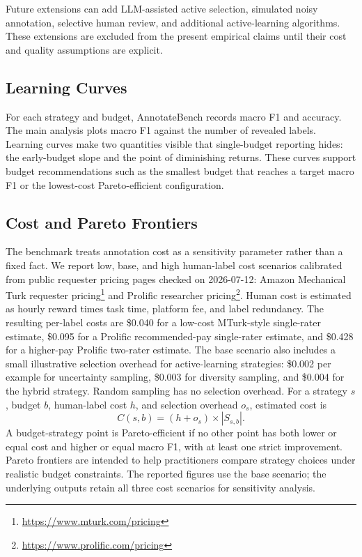 \documentclass[11pt]{article}
\begin{document}
Future extensions can add LLM-assisted active selection, simulated noisy annotation, selective human review, and additional active-learning algorithms. These extensions are excluded from the present empirical claims until their cost and quality assumptions are explicit.

\subsection{Learning Curves}

For each strategy and budget, AnnotateBench records macro F1 and accuracy. The main analysis plots macro F1 against the number of revealed labels. Learning curves make two quantities visible that single-budget reporting hides: the early-budget slope and the point of diminishing returns. These curves support budget recommendations such as the smallest budget that reaches a target macro F1 or the lowest-cost Pareto-efficient configuration.

\subsection{Cost and Pareto Frontiers}

The benchmark treats annotation cost as a sensitivity parameter rather than a fixed fact. We report low, base, and high human-label cost scenarios calibrated from public requester pricing pages checked on 2026-07-12: Amazon Mechanical Turk requester pricing\footnote{\url{https://www.mturk.com/pricing}} and Prolific researcher pricing\footnote{\url{https://www.prolific.com/pricing}}. Human cost is estimated as hourly reward times task time, platform fee, and label redundancy. The resulting per-label costs are \$0.040 for a low-cost MTurk-style single-rater estimate, \$0.095 for a Prolific recommended-pay single-rater estimate, and \$0.428 for a higher-pay Prolific two-rater estimate. The base scenario also includes a small illustrative selection overhead for active-learning strategies: \$0.002 per example for uncertainty sampling, \$0.003 for diversity sampling, and \$0.004 for the hybrid strategy. Random sampling has no selection overhead. For a strategy $s$, budget $b$, human-label cost $h$, and selection overhead $o_s$, estimated cost is
\[
  C(s,b)=(h + o_s) \times |S_{s,b}|.
\]
A budget-strategy point is Pareto-efficient if no other point has both lower or equal cost and higher or equal macro F1, with at least one strict improvement. Pareto frontiers are intended to help practitioners compare strategy choices under realistic budget constraints. The reported figures use the base scenario; the underlying outputs retain all three cost scenarios for sensitivity analysis.
\end{document}
